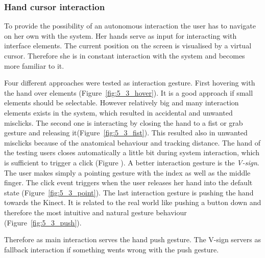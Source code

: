 \subsubsection{Hand cursor interaction}
To provide the possibility of an autonomous interaction the user has to navigate on her own with the system. Her hands serve as input for interacting with interface elements. The current position on the screen is visualised by a virtual cursor. Therefore she is in constant interaction with the system and becomes more familiar to it.

Four different approaches were tested as interaction gesture. First hovering with the hand over elements (Figure~\ref{fig:5_3_hover}). It is a good approach if small elements should be selectable. However relatively big and many interaction elements exists in the system, which resulted in accidental and unwanted misclicks.
The second one is interacting by closing the hand to a fist or grab gesture and releasing it(Figure~\ref{fig:5_3_fist}). This resulted also in unwanted misclicks because of the anatomical behaviour and tracking distance. The hand of the testing users closes automatically a little bit during system interaction, which is sufficient to trigger a click (Figure ).
A better interaction gesture is the \textit{V-sign}. The user makes simply a pointing gesture with the index as well as the middle finger. The click event triggers when the user releases her hand into the default state (Figure~\ref{fig:5_3_point}). The last interaction gesture is pushing the hand towards the Kinect. It is related to the real world like pushing a button down and therefore the most intuitive and natural gesture behaviour (Figure~\ref{fig:5_3_push}). %

Therefore as main interaction serves the hand push gesture. The V-sign servers as fallback interaction if something wents wrong with the push gesture.

